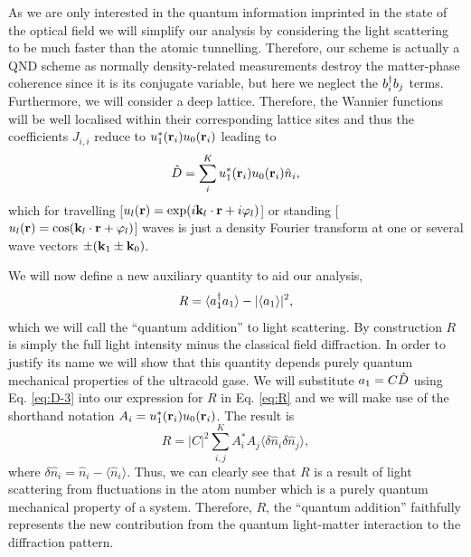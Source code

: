 As we are only interested in the quantum information imprinted in the
state of the optical field we will simplify our analysis by
considering the light scattering to be much faster than the atomic
tunnelling. Therefore, our scheme is actually a QND scheme
\cite{rogers2014, mekhov2007prl, mekhov2007pra, eckert2008} as
normally density-related measurements destroy the matter-phase
coherence since it is its conjugate variable, but here we neglect the
$b^\dagger_i b_j$ terms. Furthermore, we will consider a deep
lattice. Therefore, the Wannier functions will be well localised
within their corresponding lattice sites and thus the coefficients
$J_{i,i}$ reduce to $u_1^*(\mathbf{r}_i) u_0(\mathbf{r}_i)$ leading to
\begin{equation}
  \label{eq:D-3}
  \hat{D}=\sum_i^K u_1^*(\mathbf{r}_i) u_0(\mathbf{r}_i) \hat{n}_i,
\end{equation} 
which for travelling
[$u_l(\mathbf{r})=\exp(i \mathbf{k}_l \cdot \mathbf{r}+i\varphi_l)$] or standing
[$u_l(\mathbf{r})=\cos(\mathbf{k}_l \cdot \mathbf{r}+\varphi_l)$] waves is just a
density Fourier transform at one or several wave vectors
$\pm(\mathbf{k}_1 \pm \mathbf{k}_0)$. 

We will now define a new auxiliary quantity to aid our analysis,
\begin{equation}
  \label{eq:R}
  R = \langle a^\dagger_1 a_1 \rangle - | \langle a_1 \rangle |^2,
\end{equation}
which we will call the ``quantum addition'' to light scattering. By
construction $R$ is simply the full light intensity minus the
classical field diffraction. In order to justify its name we will show
that this quantity depends purely quantum mechanical properties of the
ultracold gase. We will substitute $a_1 = C \hat{D}$ using
Eq. \eqref{eq:D-3} into our expression for $R$ in Eq. \eqref{eq:R} and
we will make use of the shorthand notation
$A_i = u_1^*(\mathbf{r}_i) u_0(\mathbf{r}_i)$. The result is
\begin{equation}
  R = |C|^2 \sum_{i,j}^K A^*_i A_j \langle \delta \hat{n}_i \delta
  \hat{n}_j \rangle,
\end{equation}
where $\delta \hat{n}_i = \hat{n}_i - \langle \hat{n}_i
\rangle$. Thus, we can clearly see that $R$ is a result of light
scattering from fluctuations in the atom number which is a purely
quantum mechanical property of a system. Therefore, $R$, the ``quantum
addition'' faithfully represents the new contribution from the quantum
light-matter interaction to the diffraction pattern.

